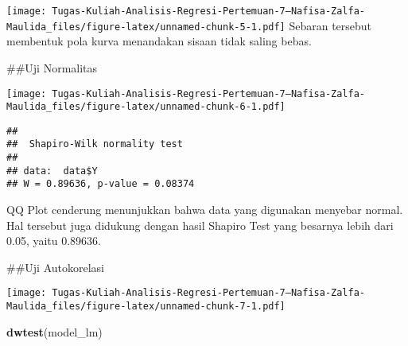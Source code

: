 \documentclass[
]{article}
\newenvironment{Shaded}{\begin{snugshade}}{\end{snugshade}}
\newcommand{\AttributeTok}[1]{\textcolor[rgb]{0.13,0.29,0.53}{#1}}
\newcommand{\FunctionTok}[1]{\textcolor[rgb]{0.13,0.29,0.53}{\textbf{#1}}}
\newcommand{\NormalTok}[1]{#1}
\newcommand{\SpecialCharTok}[1]{\textcolor[rgb]{0.81,0.36,0.00}{\textbf{#1}}}
\newcommand{\StringTok}[1]{\textcolor[rgb]{0.31,0.60,0.02}{#1}}
\begin{document}
\texttt{[image: Tugas-Kuliah-Analisis-Regresi-Pertemuan-7---Nafisa-Zalfa-Maulida\_files/figure-latex/unnamed-chunk-5-1.pdf]}
Sebaran tersebut membentuk pola kurva menandakan sisaan tidak saling
bebas.

\#\#Uji Normalitas

\begin{Shaded}
\end{Shaded}

\texttt{[image: Tugas-Kuliah-Analisis-Regresi-Pertemuan-7---Nafisa-Zalfa-Maulida\_files/figure-latex/unnamed-chunk-6-1.pdf]}

\begin{Shaded}
\end{Shaded}

\begin{verbatim}
## 
##  Shapiro-Wilk normality test
## 
## data:  data$Y
## W = 0.89636, p-value = 0.08374
\end{verbatim}

QQ Plot cenderung menunjukkan bahwa data yang digunakan menyebar normal.
Hal tersebut juga didukung dengan hasil Shapiro Test yang besarnya lebih
dari 0.05, yaitu 0.89636.

\#\#Uji Autokorelasi

\begin{Shaded}
\end{Shaded}

\texttt{[image: Tugas-Kuliah-Analisis-Regresi-Pertemuan-7---Nafisa-Zalfa-Maulida\_files/figure-latex/unnamed-chunk-7-1.pdf]}

\begin{Shaded}
\begin{Highlighting}[]
\FunctionTok{dwtest}\NormalTok{(model\_lm)}
\end{Highlighting}
\end{Shaded}
\end{document}
